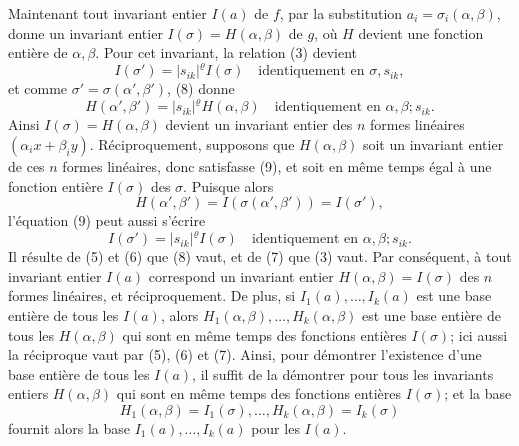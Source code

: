 Maintenant tout invariant entier $I(a)$ de $f$, par la substitution $a_i=\sigma_i(\alpha,\beta)$, donne un invariant entier $I(\sigma)=H(\alpha,\beta)$ de $g$, où $H$ devient une fonction entière de $\alpha,\beta$. Pour cet invariant, la relation (3) devient
\begin{equation}
        I(\sigma')=|s_{ik}|^\varrho I(\sigma)
        \quad \text{identiquement en $\sigma,s_{ik}$},
\end{equation}
et comme $\sigma'=\sigma(\alpha',\beta')$, (8) donne
\begin{equation}
        H(\alpha',\beta')=|s_{ik}|^\varrho H(\alpha,\beta)
        \quad \text{identiquement en $\alpha,\beta;s_{ik}$}.
\end{equation}
Ainsi $I(\sigma)=H(\alpha,\beta)$ devient un invariant entier des $n$ formes linéaires $(\alpha_i x+\beta_i y)$. Réciproquement, supposons que $H(\alpha,\beta)$ soit un invariant entier de ces $n$ formes linéaires, donc satisfasse (9), et soit en même temps égal à une fonction entière $I(\sigma)$ des $\sigma$. Puisque alors
\[
        H(\alpha',\beta')=I(\sigma(\alpha',\beta'))=I(\sigma'),
\]
l'équation (9) peut aussi s'écrire
\begin{equation*}
        I(\sigma')=|s_{ik}|^\varrho I(\sigma)
        \quad \text{identiquement en $\alpha,\beta;s_{ik}$}.\tag{9a}
\end{equation*}
Il résulte de (5) et (6) que (8) vaut, et de (7) que (3) vaut. Par conséquent, à tout invariant entier $I(a)$ correspond un invariant entier $H(\alpha,\beta)=I(\sigma)$ des $n$ formes linéaires, et réciproquement. De plus, si $I_1(a),\ldots,I_k(a)$ est une base entière de tous les $I(a)$, alors $H_1(\alpha,\beta),\ldots,H_k(\alpha,\beta)$ est une base entière de tous les $H(\alpha,\beta)$ qui sont en même temps des fonctions entières $I(\sigma)$; ici aussi la réciproque vaut par (5), (6) et (7). Ainsi, pour démontrer l'existence d'une base entière de tous les $I(a)$, il suffit de la démontrer pour tous les invariants entiers $H(\alpha,\beta)$ qui sont en même temps des fonctions entières $I(\sigma)$; et la base
\[
        H_1(\alpha,\beta)=I_1(\sigma),\ldots,H_k(\alpha,\beta)=I_k(\sigma)
\]
fournit alors la base $I_1(a),\ldots,I_k(a)$ pour les $I(a)$.

